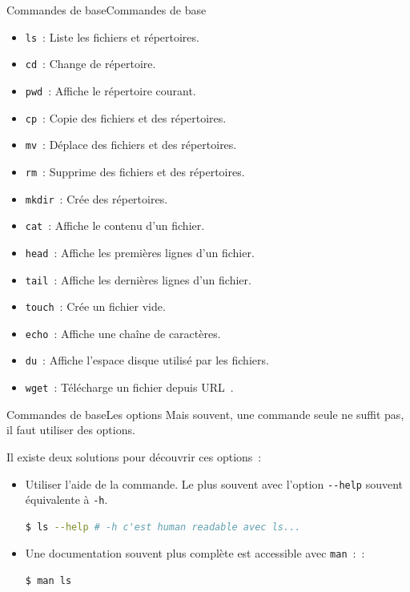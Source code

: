 \documentclass{beamer}
\begin{document}
    \begin{frame}{Commandes de base}{Commandes de base}
        \begin{itemize}
            \item \lstinline{ls}~: Liste les fichiers et répertoires.
            \item \lstinline{cd}~: Change de répertoire.
            \item \lstinline{pwd}~: Affiche le répertoire courant.
            \item \lstinline{cp}~: Copie des fichiers et des répertoires.
            \item \lstinline{mv}~: Déplace des fichiers et des répertoires.
            \item \lstinline{rm}~: Supprime des fichiers et des répertoires.
            \item \lstinline{mkdir}~: Crée des répertoires.
            \item \lstinline{cat}~: Affiche le contenu d'un fichier.
            \item \lstinline{head}~: Affiche les premières lignes d'un fichier.
            \item \lstinline{tail}~: Affiche les dernières lignes d'un fichier.
            \item \lstinline{touch}~: Crée un fichier vide.
            \item \lstinline{echo}~: Affiche une chaîne de caractères.
            \item \lstinline{du}~: Affiche l'espace disque utilisé par les fichiers.
            \item \lstinline{wget}~: Télécharge un fichier depuis URL~.
        \end{itemize}
    \end{frame}

    \begin{frame}[fragile]{Commandes de base}{Les options}
        Mais souvent, une commande seule ne suffit pas, il faut utiliser des options.

        Il existe deux solutions pour découvrir ces options~:
        \begin{itemize}
            \item Utiliser l'aide de la commande.
            Le plus souvent avec l'option \lstinline{--help} souvent équivalente à \lstinline{-h}.
            \begin{lstlisting}[language=bash]
$ ls --help # -h c'est human readable avec ls...
            \end{lstlisting}
            \item Une documentation souvent plus complète est accessible avec \lstinline{man}~:~:
            \begin{lstlisting}[language=bash]
$ man ls
            \end{lstlisting}
        \end{itemize}
    \end{frame}
\end{document}
